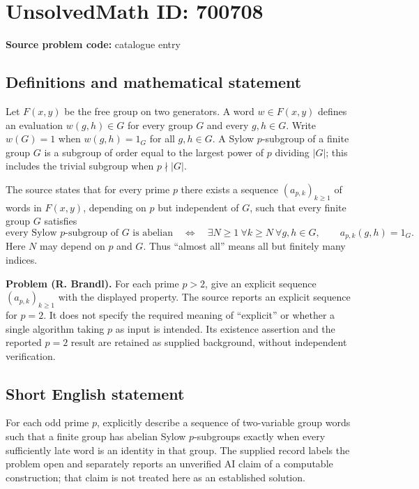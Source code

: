 \documentclass[11pt]{article}
\begin{document}
\section*{UnsolvedMath ID: 700708}
\textbf{Source problem code:} catalogue entry
\subsection{Definitions and mathematical statement}
Let \(F(x,y)\) be the free group on two generators. A word \(w\in F(x,y)\) defines an evaluation \(w(g,h)\in G\) for every group \(G\) and every \(g,h\in G\). Write \(w(G)=1\) when \(w(g,h)=1_G\) for all \(g,h\in G\). A Sylow \(p\)-subgroup of a finite group \(G\) is a subgroup of order equal to the largest power of \(p\) dividing \(|G|\); this includes the trivial subgroup when \(p\nmid |G|\).

The source states that for every prime \(p\) there exists a sequence \((a_{p,k})_{k\geq 1}\) of words in \(F(x,y)\), depending on \(p\) but independent of \(G\), such that every finite group \(G\) satisfies
\[
\text{every Sylow \(p\)-subgroup of \(G\) is abelian}
\quad\Longleftrightarrow\quad
\exists N\geq 1\ \forall k\geq N\ \forall g,h\in G,\qquad a_{p,k}(g,h)=1_G.
\]
Here \(N\) may depend on \(p\) and \(G\). Thus ``almost all'' means all but finitely many indices.

\textbf{Problem (R. Brandl).} For each prime \(p>2\), give an explicit sequence \((a_{p,k})_{k\geq 1}\) with the displayed property. The source reports an explicit sequence for \(p=2\). It does not specify the required meaning of ``explicit'' or whether a single algorithm taking \(p\) as input is intended. Its existence assertion and the reported \(p=2\) result are retained as supplied background, without independent verification.
\subsection{Short English statement}
For each odd prime \(p\), explicitly describe a sequence of two-variable group words such that a finite group has abelian Sylow \(p\)-subgroups exactly when every sufficiently late word is an identity in that group. The supplied record labels the problem open and separately reports an unverified AI claim of a computable construction; that claim is not treated here as an established solution.
\end{document}
